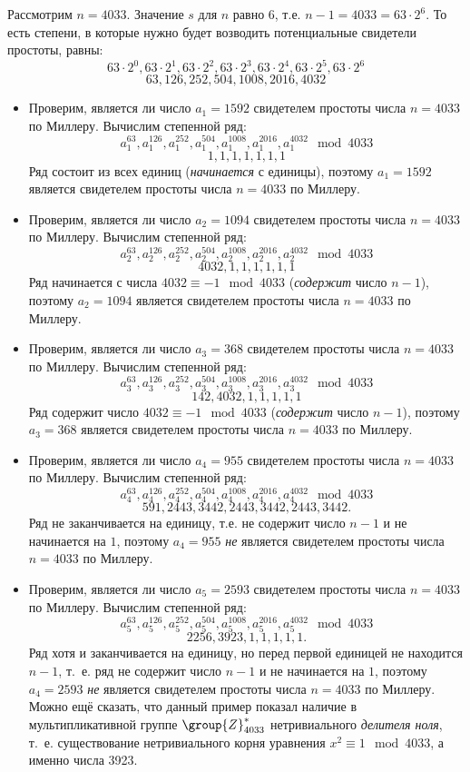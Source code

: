 \example
Рассмотрим $n=4033$. Значение $s$ для $n$ равно $6$, т.е. $n - 1 = 4033 = 63 \cdot 2^6$. То есть степени, в которые нужно будет возводить потенциальные свидетели простоты, равны:
\[ 63 \cdot 2^0, 63 \cdot 2^1, 63 \cdot 2^2, 63 \cdot 2^3, 63 \cdot 2^4, 63 \cdot 2^5, 63 \cdot 2^6 \]
\[ 63, 126, 252, 504, 1008, 2016, 4032 \]
\begin{itemize}
	\item Проверим, является ли число $a_1 = 1592$ свидетелем простоты числа $n = 4033$ по Миллеру. Вычислим степенной ряд:
		\[ a_1^{63}, a_1^{126}, a_1^{252}, a_1^{504}, a_1^{1008}, a_1^{2016}, a_1^{4032} \mod 4033 \]
		\[ 1, 1, 1, 1, 1, 1, 1 \]
		Ряд состоит из всех единиц (\emph{начинается} с единицы), поэтому $a_1 = 1592$ является свидетелем простоты числа $n = 4033$ по Миллеру.
	\item Проверим, является ли число $a_2 = 1094$ свидетелем простоты числа $n = 4033$ по Миллеру. Вычислим степенной ряд:
		\[ a_2^{63}, a_2^{126}, a_2^{252}, a_2^{504}, a_2^{1008}, a_2^{2016}, a_2^{4032} \mod 4033 \]
		\[ 4032, 1, 1, 1, 1, 1, 1 \]
		Ряд начинается с числа $4032 \equiv -1 \mod 4033$ (\emph{содержит} число $n-1$), поэтому $a_2 = 1094$ является свидетелем простоты числа $n = 4033$ по Миллеру.
	\item Проверим, является ли число $a_3 = 368$ свидетелем простоты числа $n = 4033$ по Миллеру. Вычислим степенной ряд:
		\[ a_3^{63}, a_3^{126}, a_3^{252}, a_3^{504}, a_3^{1008}, a_3^{2016}, a_3^{4032} \mod 4033 \]
		\[ 142, 4032, 1, 1, 1, 1, 1 \]
		Ряд содержит число $4032 \equiv -1 \mod 4033$ (\emph{содержит} число $n-1$), поэтому $a_3 = 368$ является свидетелем простоты числа $n = 4033$ по Миллеру.
	\item Проверим, является ли число $a_4 = 955$ свидетелем простоты числа $n = 4033$ по Миллеру. Вычислим степенной ряд:
		\[ a_4^{63}, a_4^{126}, a_4^{252}, a_4^{504}, a_4^{1008}, a_4^{2016}, a_4^{4032} \mod 4033 \]
		\[ 591, 2443, 3442, 2443, 3442, 2443, 3442. \]
		Ряд не заканчивается на единицу, т.е. не содержит число $n-1$ и не начинается на $1$, поэтому $a_4 = 955$ \emph{не} является свидетелем простоты числа $n = 4033$ по Миллеру.
	\item Проверим, является ли число $a_5 = 2593$ свидетелем простоты числа $n = 4033$ по Миллеру. Вычислим степенной ряд:
		\[ a_5^{63}, a_5^{126}, a_5^{252}, a_5^{504}, a_5^{1008}, a_5^{2016}, a_5^{4032} \mod 4033 \]
		\[ 2256, 3923, 1, 1, 1, 1, 1. \]
		Ряд хотя и заканчивается на единицу, но перед первой единицей не находится $n-1$, т.~е. ряд не содержит число $n-1$ и не начинается на $1$, поэтому $a_4 = 2593$ \emph{не} является свидетелем простоты числа $n = 4033$ по Миллеру. Можно ещё сказать, что данный пример показал наличие в мультипликативной группе $\group{Z}_{4033}^{*}$ нетривиального \emph{делителя ноля}, т.~е. существование нетривиального корня уравнения $ x^2 \equiv 1 \mod 4033$, а именно числа 3923.
\end{itemize}
\exampleend

